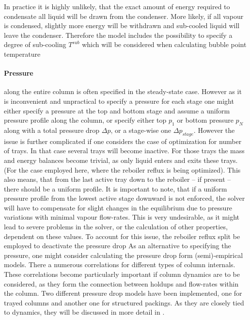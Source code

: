        In practice it is highly unlikely, that the exact amount of energy required to condensate all
        liquid will be drawn from the condenser. More likely, if all vapour is condensed, slightly more
        energy will be withdrawn and sub-cooled liquid will leave the condenser. Therefore
        the model includes the possibility to specify a degree of sub-cooling $T^{sub}$ which will be
        considered when calculating bubble point temperature
        \paragraph{Pressure} along the entire column is often specified in the steady-state case.
        However as it is inconvenient and unpractical to specify a pressure for each stage one might either specify
        a pressure at the top and bottom stage and assume a uniform pressure profile along the column, or
        specify either top $p_1$ or bottom pressure $p_N$ along with a total pressure drop $\Delta p$,
        or a stage-wise one $\Delta p_{stage}$. However the issue is further complicated if one considers the
        case of optimization for number of trays. In that case several trays will become inactive. For those
        trays the mass and energy balances become trivial, as only liquid enters and exits these trays.
        (For the case employed here, where the reboiler reflux is being optimized). This also means,
        that from the last active tray down to the reboiler -- if present -- there should be a uniform
        profile. It is important to note, that if a uniform pressure profile from the lowest active stage
        downward is not enforced, the solver will have to compensate for slight changes in the equilibrium
        due to pressure variations with minimal vapour flow-rates. This is very undesirable, as it might 
        lead to severe problems in the solver, or the calculation of other properties, dependent on these values.
        To account for this issue, the reboiler reflux split be employed to deactivate the pressure drop
        As an alternative to specifying the pressure, one might consider calculating the pressure drop
        form (semi)-empirical models. There a numerous correlations for different types of column internals.
        These correlations become particularly important if column dynamics are to be considered, as they
        form the connection between holdups and flow-rates within the column. Two different pressure drop models
        have been implemented, one for trayed columns and another one for structured packings. As they are closely
        tied to dynamics, they will be discussed in more detail in .

